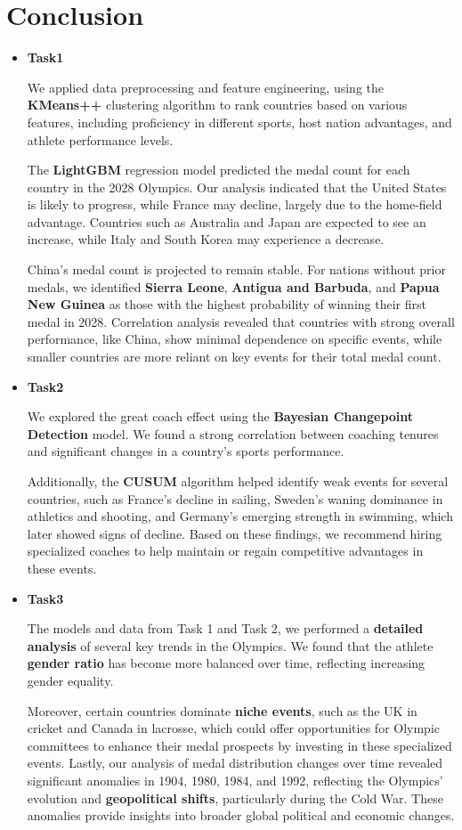 \documentclass[12pt]{article}  %
\begin{document}
\section{Conclusion}
\begin{itemize}
		\item \textbf{Task1}
		

We applied data preprocessing and feature engineering, using the \textbf{KMeans++} clustering algorithm\cite{3} to rank countries based on various features, including proficiency in different sports, host nation advantages, and athlete performance levels.

The \textbf{LightGBM} regression model predicted the medal count for each country in the 2028 Olympics. Our analysis indicated that the United States is likely to progress, while France may decline, largely due to the home-field advantage. Countries such as Australia and Japan are expected to see an increase, while Italy and South Korea may experience a decrease.

China's medal count is projected to remain stable. For nations without prior medals, we identified \textbf{Sierra Leone}, \textbf{Antigua and Barbuda}, and \textbf{Papua New Guinea} as those with the highest probability of winning their first medal in 2028. Correlation analysis revealed that countries with strong overall performance, like China, show minimal dependence on specific events, while smaller countries are more reliant on key events for their total medal count.
	

	\item \textbf{Task2}

We explored the great coach effect using the \textbf{Bayesian Changepoint Detection} model. We found a strong correlation between coaching tenures and significant changes in a country’s sports performance.
 
Additionally, the \textbf{CUSUM} algorithm helped identify weak events for several countries, such as France’s decline in sailing, Sweden’s waning dominance in athletics and shooting, and Germany’s emerging strength in swimming, which later showed signs of decline. Based on these findings, we recommend hiring specialized coaches to help maintain or regain competitive advantages in these events.
	\item \textbf{Task3}
	
The models and data from Task 1 and Task 2, we performed a \textbf{detailed analysis} of several key trends in the Olympics. We found that the athlete \textbf{gender ratio} has become more balanced over time, reflecting increasing gender equality.
 
Moreover, certain countries dominate \textbf{niche events}, such as the UK in cricket and Canada in lacrosse, which could offer opportunities for Olympic committees to enhance their medal prospects by investing in these specialized events. Lastly, our analysis of medal distribution changes over time revealed significant anomalies in 1904, 1980, 1984, and 1992, reflecting the Olympics' evolution and \textbf{geopolitical shifts}, particularly during the Cold War. These anomalies provide insights into broader global political and economic changes.
\end{itemize}
\end{document}
